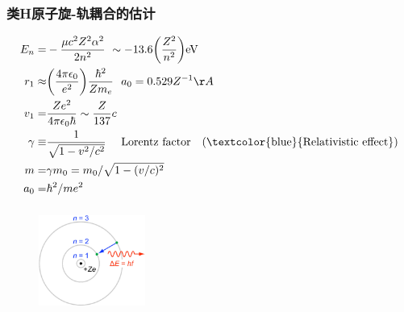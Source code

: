 {\frame
{
	\frametitle{类\textrm{H}原子旋-轨耦合的估计}
\begin{minipage}{0.58\textwidth}
	\begin{displaymath}
		\begin{aligned}
			E_n=&-\dfrac{\mu c^2Z^2\alpha^2}{2n^2}~\sim -13.6\bigg(\dfrac{Z^2}{n^2}\bigg)\mathrm{eV}\\
			r_1\approx&\bigg(\dfrac{4\pi\epsilon_0}{e^2}\bigg)\dfrac{\hbar^2}{Zm_e} ~~ a_0=0.529Z^{-1}\AA\\
			v_1=&\dfrac{Ze^2}{4\pi\epsilon_0\hbar}\sim \dfrac{Z}{137}c\\
			\gamma\equiv&\dfrac1{\sqrt{1-v^2/c^2}}~\quad \mbox{\textrm{Lorentz~factor\quad(\textcolor{blue}{Relativistic~effect})}}\\
			m=&\gamma m_0=m_0/\sqrt{1-(v/c)^2}\\
			a_0=&\hbar^2/me^2
		\end{aligned}
	\end{displaymath}
\end{minipage}
\begin{minipage}{0.40\textwidth}
\begin{figure}[h!]
\centering
\vspace{-0.9in}
\includegraphics[height=1.35in,width=1.38in,viewport=0 0 840 800,clip]{Figures/SOC_hydrogen-H_electron.png}
\label{SOC-hydrongen-like-2}
\end{figure}
\end{minipage}
}

}
